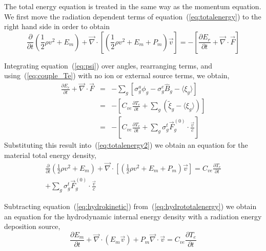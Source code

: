\documentclass[12pt]{article}
\newcommand{\partl}[2]{\ensuremath{\frac{\partial{#1}}{\partial{#2}}}}\newcommand{\del}{\ensuremath{\vec{\nabla}}}
\newcommand{\Bg}{\ensuremath{\hat{B}_{g}}}
\begin{document}
The total energy equation is treated in the same way as the
momentum equation.
We first move the radiation dependent terms of equation~(\ref{eq:totalenergy})
to the right hand side in order to obtain
\begin{equation}
        \partl{}{t}\left( \frac{1}{2} \rho v^2
                          + E_{m}\right)
         + \del \cdot \left[
              \left( \frac{1}{2} \rho v^2 + E_{m} + P_{m} \right) \vec{v}
                      \right]
    =
        - \left[ \partl{E_{r}}{t} + \del \cdot \vec{F} \right]
\label{eq:totalenergy2}
\end{equation}

Integrating equation~(\ref{eq:psi}) over angles, rearranging terms,
and using~(\ref{eq:couple_Te}) with no ion or external source terms,
we obtain,
\begin{eqnarray}
   \partl{E_{r}}{t} + \del \cdot \vec{F}
  &=&
    - \sum_{g} \left[ \sigma^{a}_{g} \phi_{g} - \sigma^{e}_{g} \Bg
    - \langle \xi_{g} \rangle \right]
  \\
  &=& 
    - \left[ C_{ve} \partl{T_{e}}{t} + \sum_{g} \left( \tilde{\xi}_{g} 
             - \langle \xi_{g} \rangle \right) \right]
  \\
  &=& 
    - \left[ C_{ve} \partl{T_{e}}{t}
             + \sum_{g} \sigma^{t}_{g} \vec{F}^{(0)}_{g} \cdot \frac{\vec{v}}{c}
      \right]
\end{eqnarray}
Substituting this result into~(\ref{eq:totalenergy2}) we obtain an equation
for the material total energy density,
\begin{multline}
        \partl{}{t}\left( \frac{1}{2} \rho v^2
                          + E_{m}\right)
         + \del \cdot \left[
              \left( \frac{1}{2} \rho v^2 + E_{m} + P_{m} \right) \vec{v}
                      \right]
    =
         C_{ve} \partl{T_{e}}{t}
     \\
            + \sum_{g} \sigma^{t}_{g} \vec{F}^{(0)}_{g} \cdot \frac{\vec{v}}{c} 
\label{eq:hydrototalenergy}
\end{multline}

Subtracting equation~(\ref{eq:hydrokinetic}) from~(\ref{eq:hydrototalenergy})
we obtain an equation for the hydrodynamic internal energy density with
a radiation energy deposition source,
\begin{equation}
  \boxed{
        \partl{E_{m}}{t}
         + \del \cdot \left( E_{m} \vec{v} \right) 
         + P_{m} \del \cdot \vec{v}
    =
         C_{ve} \partl{T_{e}}{t}
  }
\label{eq:hydrointernalenergy}
\end{equation}
\end{document}
